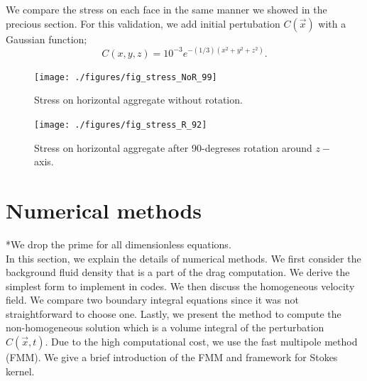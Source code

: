 We compare the stress on each face in the same manner we showed in the precious section.
For this validation, we add initial pertubation $C(\vec{x})$ with a Gaussian function;
\[
C(x,y,z) =  10^{-3} e^{-(1/3)\left(x^2 + y^2 + z^2\right)}.
\]
    \begin{figure}
    	\begin{center}
			\texttt{[image: ./figures/fig\_stress\_NoR\_99]}
    	\caption{Stress on horizontal aggregate without rotation.}
    	\label{fig_stress_NoR_99}
    \end{center}
    \end{figure}
    \begin{figure}
    	\begin{center}
			\texttt{[image: ./figures/fig\_stress\_R\_92]}
    	\caption{Stress on horizontal aggregate after 90-degreses rotation around $z-$ axis.}
    	\label{fig_stress_R_92}
    \end{center}
    \end{figure}

\section{Numerical methods}
*We drop the prime for all dimensionless equations. 
\\
In this section, we explain the details of numerical methods. We first consider the background fluid density that is a part of the drag computation. We derive the simplest form to implement in codes. We then discuss the homogeneous velocity field. We compare two boundary integral equations since it was not straightforward to choose one. Lastly, we present the method to compute the non-homogeneous solution which is a volume integral of the perturbation $C(\vec{x},t)$. Due to the high computational cost, we use the fast multipole method (FMM). We give a brief introduction of the FMM and framework for Stokes kernel.

